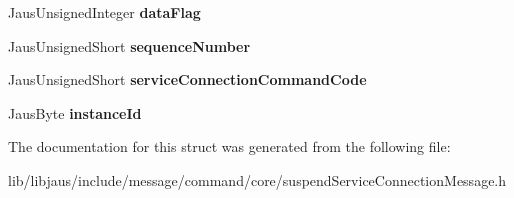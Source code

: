 \begin{DoxyCompactItemize}
\item 
\hypertarget{struct_suspend_service_connection_message_struct_a480d45065edad8941eb0eef914b665d1}{\-Jaus\-Unsigned\-Integer {\bfseries data\-Flag}}\label{struct_suspend_service_connection_message_struct_a480d45065edad8941eb0eef914b665d1}

\item 
\hypertarget{struct_suspend_service_connection_message_struct_a0b2ac7fe71be981da07291841f211c22}{\-Jaus\-Unsigned\-Short {\bfseries sequence\-Number}}\label{struct_suspend_service_connection_message_struct_a0b2ac7fe71be981da07291841f211c22}

\item 
\hypertarget{struct_suspend_service_connection_message_struct_a617b753522f60a40f4beb3ee34c3e0eb}{\-Jaus\-Unsigned\-Short {\bfseries service\-Connection\-Command\-Code}}\label{struct_suspend_service_connection_message_struct_a617b753522f60a40f4beb3ee34c3e0eb}

\item 
\hypertarget{struct_suspend_service_connection_message_struct_a2b3eeeb3667ba01e10bc9d76ec5f79ed}{\-Jaus\-Byte {\bfseries instance\-Id}}\label{struct_suspend_service_connection_message_struct_a2b3eeeb3667ba01e10bc9d76ec5f79ed}

\end{DoxyCompactItemize}


\-The documentation for this struct was generated from the following file\-:\begin{DoxyCompactItemize}
\item 
lib/libjaus/include/message/command/core/suspend\-Service\-Connection\-Message.\-h\end{DoxyCompactItemize}
